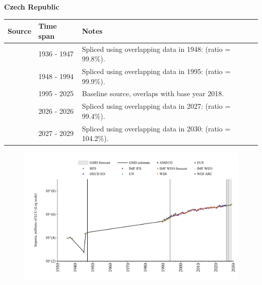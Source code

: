 \documentclass[12pt,a4paper,landscape]{article}
\begin{document}
\begin{adjustbox}{max totalsize={\paperwidth}{\paperheight},center}
\begin{minipage}[t][\textheight][t]{\textwidth}
\vspace*{0.5cm}
{}
\begin{center}
{\Large\bfseries Czech Republic}
\end{center}
\vspace{0.5cm}
\begin{table}[H]
\centering
\small
\begin{tabular}{|l|l|l|}
\hline
\textbf{Source} & \textbf{Time span} & \textbf{Notes} \\
\hline
\rowcolor{white}\cite{HFS}& 1936 - 1947 &Spliced using overlapping data in 1948: (ratio = 99.8\%).\\
\rowcolor{lightgray}\cite{AMECO}& 1948 - 1994 &Spliced using overlapping data in 1995: (ratio = 99.9\%).\\
\rowcolor{white}\cite{OECD_EO}& 1995 - 2025 &Baseline source, overlaps with base year 2018.\\
\rowcolor{lightgray}\cite{AMECO}& 2026 - 2026 &Spliced using overlapping data in 2027: (ratio = 99.4\%).\\
\rowcolor{white}\cite{IMF_WEO_forecast}& 2027 - 2029 &Spliced using overlapping data in 2030: (ratio = 104.2\%).\\
\hline
\end{tabular}
\end{table}
\begin{figure}[H]
\centering
\includegraphics[width=\textwidth,height=0.6\textheight,keepaspectratio]{graphs/CZE_imports.pdf}
\end{figure}
\end{minipage}
\end{adjustbox}
\end{document}
